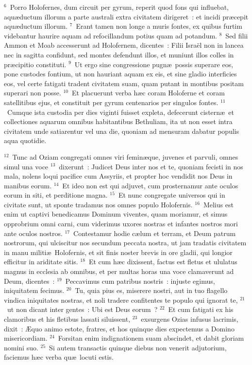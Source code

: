 ${}^{6}$~Porro Holofernes, dum circuit per gyrum, reperit quod fons qui influebat, aqu\ae ductum illorum a parte australi extra civitatem dirigeret~: et incidi pr\ae cepit aqu\ae ductum illorum.
${}^{7}$~Erant tamen non longe a muris fontes, ex quibus furtim videbantur haurire aquam ad refocillandum potius quam ad potandum.
${}^{8}$~Sed filii Ammon et Moab accesserunt ad Holofernem, dicentes~: Filii Isra\"el non in lancea nec in sagitta confidunt, sed montes defendunt illos, et muniunt illos colles in pr\ae cipitio constituti.
${}^{9}$~Ut ergo sine congressione pugn\ae\ possis superare eos, pone custodes fontium, ut non hauriant aquam ex eis, et sine gladio interficies eos, vel certe fatigati tradent civitatem suam, quam putant in montibus positam superari non posse.
${}^{10}$~Et placuerunt verba h\ae c coram Holoferne et coram satellitibus ejus, et constituit per gyrum centenarios per singulos fontes.
${}^{11}$~Cumque ista custodia per dies viginti fuisset expleta, defecerunt cistern\ae\ et collectiones aquarum omnibus habitantibus Bethuliam, ita ut non esset intra civitatem unde satiarentur vel una die, quoniam ad mensuram dabatur populis aqua quotidie.


${}^{12}$~Tunc ad Oziam congregati omnes viri femin\ae que, juvenes et parvuli, omnes simul una voce
${}^{13}$~dixerunt~: Judicet Deus inter nos et te, quoniam fecisti in nos mala, nolens loqui pacifice cum Assyriis, et propter hoc vendidit nos Deus in manibus eorum.
${}^{14}$~Et ideo non est qui adjuvet, cum prosternamur ante oculos eorum in siti, et perditione magna.
${}^{15}$~Et nunc congregate universos qui in civitate sunt, ut sponte tradamus nos omnes populo Holofernis.
${}^{16}$~Melius est enim ut captivi benedicamus Dominum viventes, quam moriamur, et simus opprobrium omni carni, cum viderimus uxores nostras et infantes nostros mori ante oculos nostros.
${}^{17}$~Contestamur hodie c\ae lum et terram, et Deum patrum nostrorum, qui ulciscitur nos secundum peccata nostra, ut jam tradatis civitatem in manu militi\ae\ Holofernis, et sit finis noster brevis in ore gladii, qui longior efficitur in ariditate sitis.
${}^{18}$~Et cum h\ae c dixissent, factus est fletus et ululatus magnus in ecclesia ab omnibus, et per multas horas una voce clamaverunt ad Deum, dicentes~:
${}^{19}$~Peccavimus cum patribus nostris~: injuste egimus, iniquitatem fecimus.
${}^{20}$~Tu, quia pius es, miserere nostri, aut in tuo flagello vindica iniquitates nostras, et noli tradere confitentes te populo qui ignorat te,
${}^{21}$~ut non dicant inter gentes~: Ubi est Deus eorum~?
${}^{22}$~Et cum fatigati ex his clamoribus et his fletibus lassati siluissent,
${}^{23}$~exsurgens Ozias infusus lacrimis, dixit~: \AE quo animo estote, fratres, et hos quinque dies expectemus a Domino misericordiam.
${}^{24}$~Forsitan enim indignationem suam abscindet, et dabit gloriam nomini suo.
${}^{25}$~Si autem transactis quinque diebus non venerit adjutorium, faciemus h\ae c verba qu\ae\ locuti estis.


